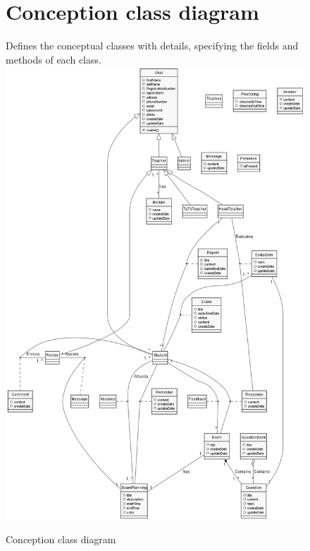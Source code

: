 \documentclass[]{uc2pfecaneva}
\begin{document}
    \begin{figure}
        \section{Conception class diagram}
        \raggedright Defines the conceptual classes with details, specifying the fields and methods of each class.
        \linebreak
        \includegraphics[width=\textwidth]{images/CCD}
        \caption{Conception class diagram}
    \end{figure}
    \clearpage
\end{document}
